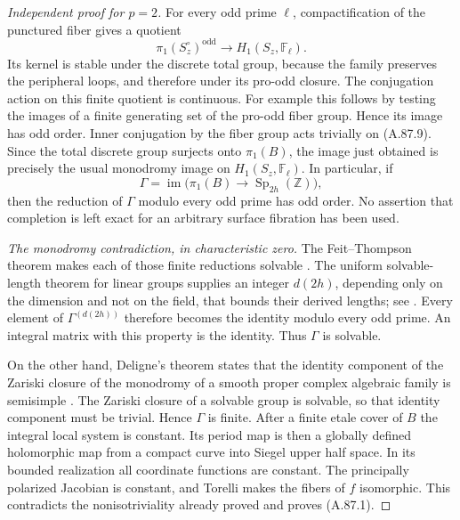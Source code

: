 \documentclass[11pt]{article}
\begin{document}
\begin{proof}[Independent proof for \(p=2\)]
For every odd prime \(\ell\), compactification of the punctured
fiber gives a quotient
\[
 \pi_1(S_z^\circ)^{\mathrm{odd}}\longrightarrow
                          H_1(S_z,\mathbb F_\ell).
                                                               \tag{A.87.9}
\]
Its kernel is stable under the discrete total group, because the
family preserves the peripheral loops, and therefore under its
pro-odd closure. The conjugation action on this finite quotient
is continuous. For example this follows by testing the images
of a finite generating set of the pro-odd fiber group. Hence its
image has odd order. Inner conjugation by the fiber group acts
trivially on (A.87.9). Since the total discrete group surjects
onto \(\pi_1(B)\), the image just obtained is precisely the
usual monodromy image on \(H_1(S_z,\mathbb F_\ell)\).
In particular, if
\[
 \Gamma=\operatorname{im}\bigl(\pi_1(B)\to
                    \operatorname{Sp}_{2h}(\mathbb Z)\bigr),
\]
then the reduction of \(\Gamma\) modulo every odd prime has
odd order. No assertion that completion is left exact for an
arbitrary surface fibration has been used.

\emph{The monodromy contradiction, in characteristic zero.}
The Feit--Thompson theorem makes each of those finite reductions
solvable \cite{AC_FeitThompson1963}. The uniform solvable-length
theorem for linear groups supplies an integer \(d(2h)\),
depending only on the dimension and not on the field, that
bounds their derived lengths; see
\cite[Section 1, printed p. 59]{AG_Newman1972}.
Every element of \(\Gamma^{(d(2h))}\) therefore becomes the
identity modulo every odd prime. An integral matrix with this
property is the identity. Thus \(\Gamma\) is solvable.

On the other hand, Deligne's theorem states that the identity
component of the Zariski closure of the monodromy of a smooth
proper complex algebraic family is semisimple
\cite[Corollary 4.2.9(a)]{AG_Deligne1971}.
The Zariski closure of a solvable group is solvable, so that
identity component must be trivial. Hence \(\Gamma\) is finite.
After a finite etale cover of \(B\) the integral local system
is constant. Its period map is then a globally defined
holomorphic map from a compact curve into Siegel upper half
space. In its bounded realization all coordinate functions are
constant. The principally polarized Jacobian is constant, and
Torelli makes the fibers of \(f\) isomorphic. This contradicts
the nonisotriviality already proved and proves (A.87.1).


\end{proof}
\end{document}

